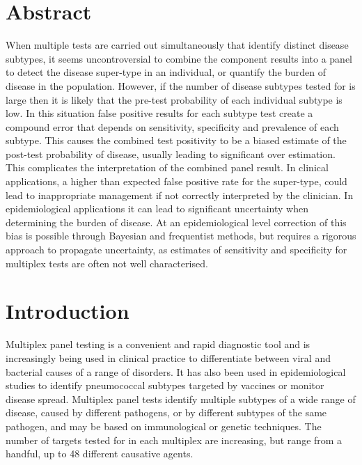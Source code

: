 \documentclass[10pt,letterpaper]{article}
\begin{document}
\section*{Abstract}
When multiple tests are carried out simultaneously that identify distinct disease subtypes, it seems uncontroversial to combine the component results into a panel to detect the disease super-type in an individual, or quantify the burden of disease in the population. However, if the number of disease subtypes tested for is large then it is likely that the pre-test probability of each individual subtype is low. In this situation false positive results for each subtype test create a compound error that depends on sensitivity, specificity and prevalence of each subtype. This causes the combined test positivity to be a biased estimate of the post-test probability of disease, usually leading to significant over estimation. This complicates the interpretation of the combined panel result. In clinical applications, a higher than expected false positive rate for the super-type, could lead to inappropriate management if not correctly interpreted by the clinician. In epidemiological applications it can lead to significant uncertainty when determining the burden of disease. At an epidemiological level correction of this bias is possible through Bayesian and frequentist methods, but requires a rigorous approach to propagate uncertainty, as estimates of sensitivity and specificity for multiplex tests are often not well characterised.


\linenumbers

\section*{Introduction}

Multiplex panel testing is a convenient and rapid diagnostic tool and is increasingly being used in clinical practice to differentiate between viral and bacterial causes of a range of disorders\cite{ramanan2017}. It has also been used in epidemiological studies to identify pneumococcal subtypes targeted by vaccines\cite{bonten2015} or monitor disease spread\cite{henson2023}. Multiplex panel tests identify multiple subtypes of a wide range of disease, caused by different pathogens, or by different subtypes of the same pathogen\cite{ramanan2017}, and may be based on immunological\cite{pride2012,kalina2020} or genetic techniques\cite{mengelle2013,murphy2020,jaaskelainen2006,jansen2011,grondahl1999,hendolin1997}. The number of targets tested for in each multiplex are increasing, but range from a handful, up to 48 different causative agents\cite{henson2023}.
\end{document}
